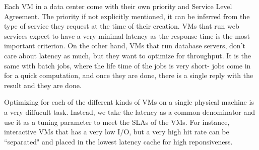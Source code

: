Each VM in a data center come with their own priority and Service Level Agreement. The priority if not explicitly mentioned, it can be inferred from the type of service they request at the time of their creation. VMs that run web services expect to have a very minimal latency as the response time is the most important criterion. On the other hand, VMs that run database servers, don't care about latency as much, but they want to optimize for throughput. It is the same with batch jobs, where the life time of the jobs is very short- jobs come in for a quick computation, and once they are done, there is a single reply with the result and they are done.

Optimizing for each of the different kinds of VMs on a single physical machine is a very diffucult task. Instead, we take the latency as a common denominator and use it as a tuning parameter to meet the SLAs of the VMs. For instance, interactive VMs that has a very low I/O, but a very high hit rate can be ``separated" and placed in the lowest latency cache for high reponsiveness. 

